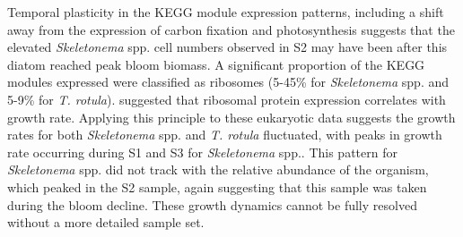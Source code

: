 Temporal plasticity in the KEGG module expression patterns, including a shift away from the expression of carbon fixation and photosynthesis suggests that the elevated \textit{Skeletonema} spp. cell numbers observed in S2 may have been after this diatom reached peak bloom biomass. A significant proportion of the KEGG modules expressed were classified as ribosomes (5-45\% for \textit{Skeletonema} spp. and 5-9\% for \textit{T. rotula}). \citet{Gifford2013} suggested that ribosomal protein expression correlates with growth rate. Applying this principle to these eukaryotic data suggests the growth rates for both \textit{Skeletonema} spp. and \textit{T. rotula} fluctuated, with peaks in growth rate occurring during S1 and S3 for \textit{Skeletonema} spp.. This pattern for \textit{Skeletonema} spp. did not track with the relative abundance of the organism, which peaked in the S2 sample, again suggesting that this sample was taken during the bloom decline. These growth dynamics cannot be fully resolved without a more detailed sample set.\par


